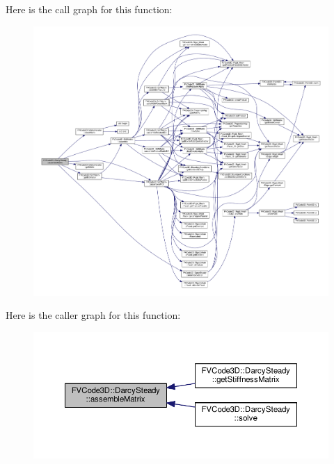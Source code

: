 Here is the call graph for this function\+:
\nopagebreak
\begin{figure}[H]
\begin{center}
\leavevmode
\includegraphics[width=350pt]{classFVCode3D_1_1DarcySteady_af48f96919f23df0f0708c8692da14bbd_cgraph}
\end{center}
\end{figure}




Here is the caller graph for this function\+:
\nopagebreak
\begin{figure}[H]
\begin{center}
\leavevmode
\includegraphics[width=350pt]{classFVCode3D_1_1DarcySteady_af48f96919f23df0f0708c8692da14bbd_icgraph}
\end{center}
\end{figure}


